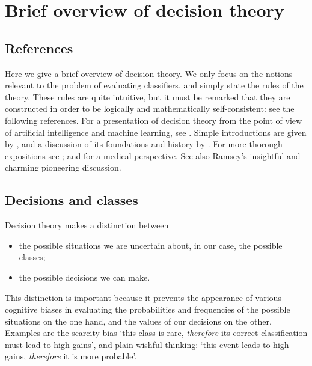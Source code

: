 \documentclass[\ifafour a4paper,12pt,\else a5paper,10pt,\fi%
onecolumn,oneside,article,%
british%
]{memoir}
\theoremstyle{remark}
\theoremstyle{innote}
\newcommand*{\wrench}{{\fontencoding{U}\fontfamily{fontawesomethree}\selectfont\symbol{114}}}
\newcommand{\mynotew}[1]{{\footnotesize\color{notecolour}\wrench\ #1}}
\renewcommand*{\|}[1][]{\nonscript\:#1\vert\nonscript\:\mathopen{}}
\newcommand*{\sect}{\S}%
\newcommand*{\chap}{ch.}%
\begin{document}




\section{Brief overview of decision theory}
\label{sec:decision_theory}

\subsection{References}
\label{sec:dt_refs}

Here we give a brief overview of decision theory. We only focus on the notions relevant to the problem of evaluating classifiers, and simply state the rules of the theory. These rules are quite intuitive, but it must be remarked that they are constructed in order to be logically and mathematically self-consistent: see the following references. For a presentation of decision theory from the point of view of artificial intelligence and machine learning, see \cite[\chap~15]{russelletal1995_r2022}. Simple introductions are given by \cite{jeffrey1965,north1968,raiffa1968_r1970}, and a discussion of its foundations and history by \cite{steeleetal2015_r2020}. For more thorough expositions see \cite{raiffaetal1961_r2000,berger1980_r1985,savage1954_r1972}; and \cite{soxetal1988_r2013,huninketal2001_r2014} for a medical perspective. See also Ramsey's \cite*{ramsey1926} insightful and charming pioneering discussion.

\subsection{Decisions and classes}
\label{sec:dt_dec_classes}

Decision theory makes a distinction between
\begin{itemize}
\item the possible situations we are uncertain about, in our case, the possible classes;
\item the possible decisions we can make.
\end{itemize}
This distinction is important because it prevents the appearance of various cognitive biases \autocites{kahnemanetal1982_r2008,gilovichetal2002_r2009,kahneman2011} in evaluating the probabilities and frequencies of the possible situations on the one hand, and the values of our decisions on the other. Examples are the scarcity bias\autocites{camereretal1989,kimetal1999,mittoneetal2009} \enquote*{this class is rare, \emph{therefore} its correct classification must lead to high gains}, and plain wishful thinking: \enquote*{this event leads to high gains, \emph{therefore} it is more probable}.
\end{document}
